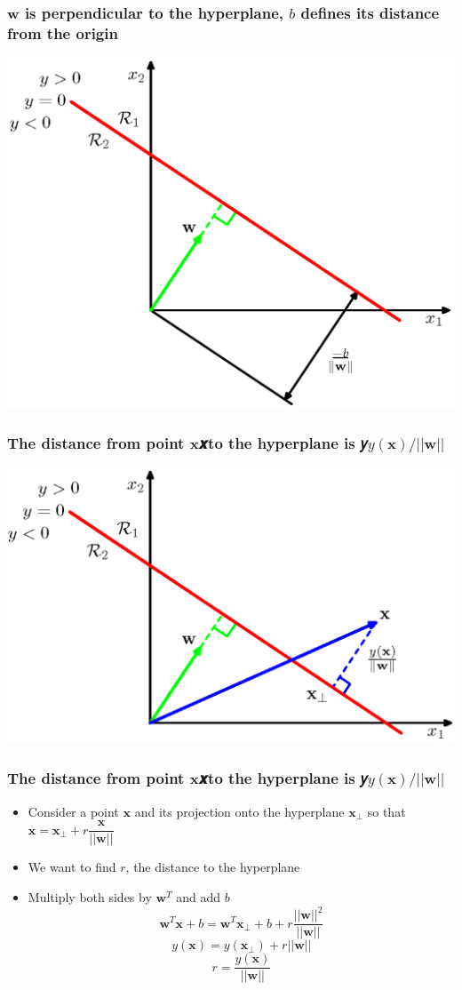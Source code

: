 \documentclass[12pt,notes,mathserif]{beamer}
\begin{document}
\begin{frame}[c]
\frametitle{$\mathbf{w}$ is perpendicular to the hyperplane, $b$ defines its distance from the origin}
\begin{center}
\includegraphics[width=0.7\linewidth]{fig8/lec815.jpg}
\end{center}
\end{frame}


\begin{frame}[c]
\frametitle{The distance from point $\mathbf{x}$𝒙to the hyperplane is 𝑦$y(\mathbf{x})/||\mathbf{w}||$}
\begin{center}
\includegraphics[width=0.7\linewidth]{fig8/lec816.jpg}
\end{center}
\end{frame}



\begin{frame}[c]
\frametitle{The distance from point $\mathbf{x}$𝒙to the hyperplane is 𝑦$y(\mathbf{x})/||\mathbf{w}||$}
\begin{itemize}
\item Consider a point $\mathbf{x}$ and its projection onto the hyperplane $\mathbf{x}_{\bot}$ so that $\mathbf{x}=\mathbf{x}_{\bot}+r\dfrac{\mathbf{x}}{||\mathbf{w}||}$
\item We want to find $r$, the distance to the hyperplane
\item Multiply both sides by $\mathbf{w}^T$ and add $b$
\[
\mathbf{w}^T\mathbf{x}+b=
\mathbf{w}^T\mathbf{x}_{\bot} +b+r\dfrac{||\mathbf{w}||^2}{||\mathbf{w}||} 
\]
\[
y(\mathbf{x})=y(\mathbf{x}_{\bot})+r||\mathbf{w}||
\]
\[
r=\dfrac{y(\mathbf{x})}{||\mathbf{w}||}
\]
\end{itemize}
\end{frame}
\end{document}

